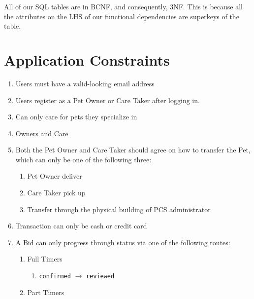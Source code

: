 \documentclass[
  paper=a4,
  ,captions=tableheading
]{scrartcl}
\newcommand{\passthrough}[1]{#1}
\providecommand{\tightlist}{%
  \setlength{\itemsep}{0pt}\setlength{\parskip}{0pt}}
\begin{document}
All of our SQL tables are in BCNF, and consequently, 3NF. This is
because all the attributes on the LHS of our functional dependencies are
superkeys of the table.

\hypertarget{application-constraints}{%
\section{Application Constraints}\label{application-constraints}}

\begin{enumerate}
\def\labelenumi{\arabic{enumi}.}
\tightlist
\item
  Users must have a valid-looking email address
\item
  Users register as a Pet Owner or Care Taker after logging in.
\item
  Can only care for pets they specialize in
\item
  Owners and Care
\item
  Both the Pet Owner and Care Taker should agree on how to transfer the
  Pet, which can only be one of the following three:

  \begin{enumerate}
  \def\labelenumii{\arabic{enumii}.}
  \tightlist
  \item
    Pet Owner deliver
  \item
    Care Taker pick up
  \item
    Transfer through the physical building of PCS administrator
  \end{enumerate}
\item
  Transaction can only be cash or credit card
\item
  A Bid can only progress through status via one of the following
  routes:

  \begin{enumerate}
  \def\labelenumii{\arabic{enumii}.}
  \tightlist
  \item
    Full Timers

    \begin{enumerate}
    \def\labelenumiii{\arabic{enumiii}.}
    \tightlist
    \item
      \passthrough{\lstinline!confirmed!} \(\rightarrow\)
      \passthrough{\lstinline!reviewed!}
    \end{enumerate}
  \item
    Part Timers


\end{enumerate}
\end{enumerate}
\end{document}
